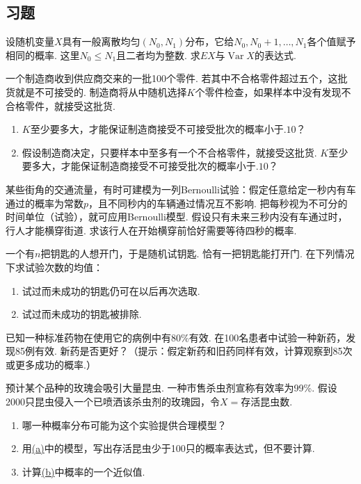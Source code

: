 \subsection{习题}\label{sec:3.7}
\setcounter{exercise}{0}
\begin{exercise}\label{exercise:3.1}
设随机变量$X$具有一般离散均匀$(N_0,N_1)$分布，它给$N_0,N_0+1,\ldots,N_1$各个值赋予相同的概率. 这里$N_0\le N_1$且二者均为整数. 求$EX$与$\operatorname{Var}X$的表达式.
\end{exercise}
\begin{exercise}\label{exercise:3.2}
一个制造商收到供应商交来的一批100个零件. 若其中不合格零件超过五个，这批货就是不可接受的. 制造商将从中随机选择$K$个零件检查，如果样本中没有发现不合格零件，就接受这批货.
\begin{enumerate}
\item[(a)] $K$至少要多大，才能保证制造商接受不可接受批次的概率小于$.10$？
\item[(b)] 假设制造商决定，只要样本中至多有一个不合格零件，就接受这批货. $K$至少要多大，才能保证制造商接受不可接受批次的概率小于$.10$？
\end{enumerate}
\end{exercise}
\begin{exercise}\label{exercise:3.3}
某些街角的交通流量，有时可建模为一列Bernoulli试验：假定任意给定一秒内有车通过的概率为常数$p$，且不同秒内的车辆通过情况互不影响. 把每秒视为不可分的时间单位（试验），就可应用Bernoulli模型. 假设只有未来三秒内没有车通过时，行人才能横穿街道. 求该行人在开始横穿前恰好需要等待四秒的概率.
\end{exercise}
\begin{exercise}\label{exercise:3.4}
一个有$n$把钥匙的人想开门，于是随机试钥匙. 恰有一把钥匙能打开门. 在下列情况下求试验次数的均值：
\begin{enumerate}
\item[(a)] 试过而未成功的钥匙仍可在以后再次选取.
\item[(b)] 试过而未成功的钥匙被排除.
\end{enumerate}
\end{exercise}
\begin{exercise}\label{exercise:3.5}
已知一种标准药物在使用它的病例中有80\%有效. 在100名患者中试验一种新药，发现85例有效. 新药是否更好？（提示：假定新药和旧药同样有效，计算观察到85次或更多成功的概率.）
\end{exercise}
\begin{exercise}\label{exercise:3.6}
预计某个品种的玫瑰会吸引大量昆虫. 一种市售杀虫剂宣称有效率为99\%. 假设2000只昆虫侵入一个已喷洒该杀虫剂的玫瑰园，令$X=$存活昆虫数.
\begin{enumerate}
\item[(a)]\label{itm:exercise:3.6:a} 哪一种概率分布可能为这个实验提供合理模型？
\item[(b)]\label{itm:exercise:3.6:b} 用\hyperref[itm:exercise:3.6:a]{(a)}中的模型，写出存活昆虫少于100只的概率表达式，但不要计算.
\item[(c)] 计算\hyperref[itm:exercise:3.6:b]{(b)}中概率的一个近似值.
\end{enumerate}
\end{exercise}
